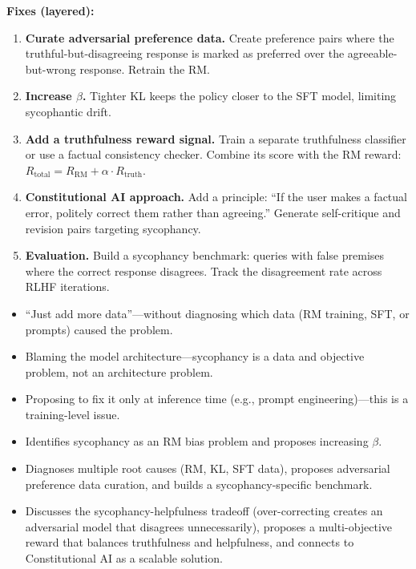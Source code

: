 \begin{interviewq}
\textbf{Fixes (layered):}
\begin{enumerate}
    \item \textbf{Curate adversarial preference data.} Create preference pairs where the truthful-but-disagreeing response is marked as preferred over the agreeable-but-wrong response. Retrain the RM.
    \item \textbf{Increase $\beta$.} Tighter KL keeps the policy closer to the SFT model, limiting sycophantic drift.
    \item \textbf{Add a truthfulness reward signal.} Train a separate truthfulness classifier or use a factual consistency checker. Combine its score with the RM reward: $R_{\text{total}} = R_{\text{RM}} + \alpha \cdot R_{\text{truth}}$.
    \item \textbf{Constitutional AI approach.} Add a principle: ``If the user makes a factual error, politely correct them rather than agreeing.'' Generate self-critique and revision pairs targeting sycophancy.
    \item \textbf{Evaluation.} Build a sycophancy benchmark: queries with false premises where the correct response disagrees. Track the disagreement rate across RLHF iterations.
\end{enumerate}

\redflags
\begin{itemize}
    \item ``Just add more data''---without diagnosing which data (RM training, SFT, or prompts) caused the problem.
    \item Blaming the model architecture---sycophancy is a data and objective problem, not an architecture problem.
    \item Proposing to fix it only at inference time (e.g., prompt engineering)---this is a training-level issue.
\end{itemize}


\goodgreat
\begin{itemize}
    \item {} Identifies sycophancy as an RM bias problem and proposes increasing $\beta$.
    \item {} Diagnoses multiple root causes (RM, KL, SFT data), proposes adversarial preference data curation, and builds a sycophancy-specific benchmark.
    \item {} Discusses the sycophancy-helpfulness tradeoff (over-correcting creates an adversarial model that disagrees unnecessarily), proposes a multi-objective reward that balances truthfulness and helpfulness, and connects to Constitutional AI as a scalable solution.
\end{itemize}

\end{interviewq}

